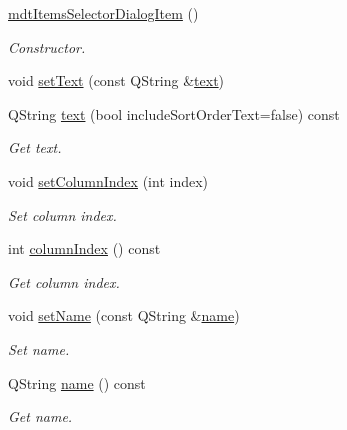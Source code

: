 \begin{DoxyCompactItemize}
\item 
\hyperlink{classmdt_items_selector_dialog_item_aeaf69ab67bb22d9c0f24f8e87c440228}{mdt\-Items\-Selector\-Dialog\-Item} ()
\begin{DoxyCompactList}\small\item\em Constructor. \end{DoxyCompactList}\item 
void \hyperlink{classmdt_items_selector_dialog_item_aea8ca747652de3bece3321ec9d01ea46}{set\-Text} (const Q\-String \&\hyperlink{classmdt_items_selector_dialog_item_a6b7064dd49e4fe8f683d2797f6caac68}{text})
\item 
Q\-String \hyperlink{classmdt_items_selector_dialog_item_a6b7064dd49e4fe8f683d2797f6caac68}{text} (bool include\-Sort\-Order\-Text=false) const 
\begin{DoxyCompactList}\small\item\em Get text. \end{DoxyCompactList}\item 
void \hyperlink{classmdt_items_selector_dialog_item_a6276ae9222fd1ab0f545fddec5894548}{set\-Column\-Index} (int index)
\begin{DoxyCompactList}\small\item\em Set column index. \end{DoxyCompactList}\item 
int \hyperlink{classmdt_items_selector_dialog_item_a1b1af80a456c2f77472bd7bb10960aac}{column\-Index} () const 
\begin{DoxyCompactList}\small\item\em Get column index. \end{DoxyCompactList}\item 
void \hyperlink{classmdt_items_selector_dialog_item_a7509254941d37a5c3eda86069d853b48}{set\-Name} (const Q\-String \&\hyperlink{classmdt_items_selector_dialog_item_a9b77955435a5841b65266e6fd93284e1}{name})
\begin{DoxyCompactList}\small\item\em Set name. \end{DoxyCompactList}\item 
Q\-String \hyperlink{classmdt_items_selector_dialog_item_a9b77955435a5841b65266e6fd93284e1}{name} () const 
\begin{DoxyCompactList}\small\item\em Get name. \end{DoxyCompactList}\item 

\end{DoxyCompactItemize}
